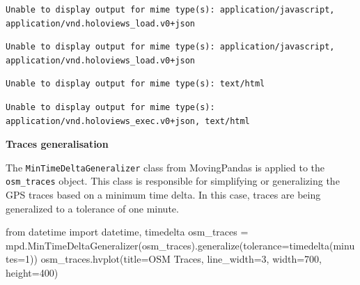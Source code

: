 \documentclass[
  letterpaper,
  DIV=11,
  numbers=noendperiod]{scrreprt}
\newenvironment{Shaded}{\begin{snugshade}}{\end{snugshade}}
\newcommand{\DecValTok}[1]{\textcolor[rgb]{0.68,0.00,0.00}{#1}}
\newcommand{\ImportTok}[1]{\textcolor[rgb]{0.00,0.46,0.62}{#1}}
\newcommand{\NormalTok}[1]{\textcolor[rgb]{0.00,0.23,0.31}{#1}}
\newcommand{\OperatorTok}[1]{\textcolor[rgb]{0.37,0.37,0.37}{#1}}
\newcommand{\StringTok}[1]{\textcolor[rgb]{0.13,0.47,0.30}{#1}}
\begin{document}
\begin{verbatim}
Unable to display output for mime type(s): application/javascript, application/vnd.holoviews_load.v0+json
\end{verbatim}

\begin{verbatim}
Unable to display output for mime type(s): application/javascript, application/vnd.holoviews_load.v0+json
\end{verbatim}

\begin{verbatim}
Unable to display output for mime type(s): text/html
\end{verbatim}

\begin{verbatim}
Unable to display output for mime type(s): application/vnd.holoviews_exec.v0+json, text/html
\end{verbatim}

\textbf{Traces generalisation}

The \texttt{MinTimeDeltaGeneralizer} class from MovingPandas is applied
to the \texttt{osm\_traces} object. This class is responsible for
simplifying or generalizing the GPS traces based on a minimum time
delta. In this case, traces are being generalized to a tolerance of one
minute.

\begin{Shaded}
\begin{Highlighting}[]
\ImportTok{from}\NormalTok{ datetime }\ImportTok{import}\NormalTok{ datetime, timedelta}
\NormalTok{osm\_traces }\OperatorTok{=}\NormalTok{ mpd.MinTimeDeltaGeneralizer(osm\_traces).generalize(tolerance}\OperatorTok{=}\NormalTok{timedelta(minutes}\OperatorTok{=}\DecValTok{1}\NormalTok{))}
\NormalTok{osm\_traces.hvplot(title}\OperatorTok{=}\StringTok{\textquotesingle{}OSM Traces\textquotesingle{}}\NormalTok{, line\_width}\OperatorTok{=}\DecValTok{3}\NormalTok{, width}\OperatorTok{=}\DecValTok{700}\NormalTok{, height}\OperatorTok{=}\DecValTok{400}\NormalTok{)}
\end{Highlighting}
\end{Shaded}
\end{document}
